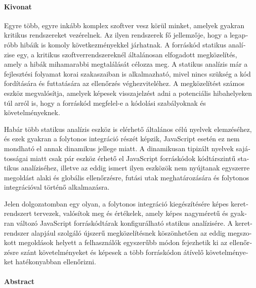 \begin{otherlanguage}{magyar}

  \paragraph*{Kivonat}
  \thispagestyle{plain}
  {
  \selecthungarian

  Egyre több, egyre inkább komplex szoftver vesz körül minket, amelyek gyakran kritikus rendszereket vezérelnek. Az ilyen rendszerek fő jellemzője, hogy a legapróbb hibáik is komoly következményekkel járhatnak. A forráskód statikus analízise egy, a kritikus szoftverrendszereknél általánosan elfogadott megközelítés, amely a hibák mihamarabbi megtalálását célozza meg. A statikus analízis már a fejlesztési folyamat korai szakaszaiban is alkalmazható, mivel nincs szükség a kód fordítására és futtatására az ellenőrzés véghezviteléhez. A megközelítést számos eszköz megvalósítja, amelyek képesek visszajelzést adni a potenciális hibahelyeken túl arról is, hogy a forráskód megfelel-e a kódolási szabályoknak és követelményeknek.

  Habár több statikus analízis eszköz is elérhető általános célú nyelvek elemzéséhez, és ezek gyakran a folytonos integráció részét képzik, JavaScript esetén ez nem mondható el annak dinamikus jellege miatt. A dinamikusan tipizált nyelvek sajátosságai miatt csak pár eszköz érhető el JavaScript forráskódok kódtárszintű statikus analíziséhez, illetve az eddig ismert ilyen eszközök nem nyújtanak egyszerre megoldást alaki és globális ellenőrzésre, futási utak meghatározására és folytonos integrációval történő alkalmazásra.

  Jelen dolgozatomban egy olyan, a folytonos integráció kiegészítésére képes keretrendszert tervezek, valósítok meg és értékelek, amely képes nagyméretű és gyakran változó Java\-Script forráskódtárak konfigurálható statikus analízisére. A keretrendszer alapjául szolgáló újszerű megközelítésnek köszönhetően az eddig megszokott megoldások helyett a felhasználók egyszerűbb módon fejezhetik ki az ellenőrzésre szánt követelményeket és képesek a több forráskódon átívelő követelményeket hatékonyabban ellenőrizni.

  }

\end{otherlanguage}

\cleardoublepage

\paragraph*{Abstract}
{}
\thispagestyle{plain}


